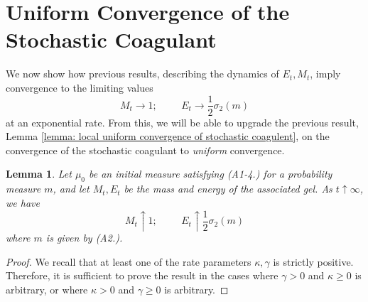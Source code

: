 \documentclass[11pt, notitlepage]{article}
\newtheorem{lem}[thm]{Lemma}
\begin{document}
\section{\textbf{Uniform Convergence of the Stochastic Coagulant}} \label{sec: uniform convergence} We now show how previous results, describing the dynamics of $E_t, M_t$, imply convergence to the limiting values \begin{equation} M_t\rightarrow 1;\hspace{1cm} E_t\rightarrow \frac{1}{2}\sigma_2(m) \end{equation} at an exponential rate.  From this, we will be able to upgrade the previous result, Lemma \ref{lemma: local uniform convergence of stochastic coagulent}, on the convergence of the stochastic coagulant to \emph{uniform} convergence. \begin{lem}\label{lemma: M and E at infinity} Let $\mu_0$ be an initial measure satisfying (A1-4.) for a probability measure $m$, and let $M_t, E_t$ be the mass and energy of the associated gel. As $t\uparrow \infty$, we have \begin{equation}
    M_t\uparrow 1; \hspace{1cm}E_t\uparrow  \frac{1}{2}\sigma_2(m)
\end{equation} where $m$ is given by (A2.). \end{lem} \begin{proof} We recall that at least one of the rate parameters $\kappa, \gamma$ is strictly positive. Therefore, it is sufficient to prove the result in the cases where $\gamma>0$ and $\kappa \ge 0$ is arbitrary, or where $\kappa>0$ and $\gamma \ge 0$ is arbitrary.

\end{proof}
\end{document}
